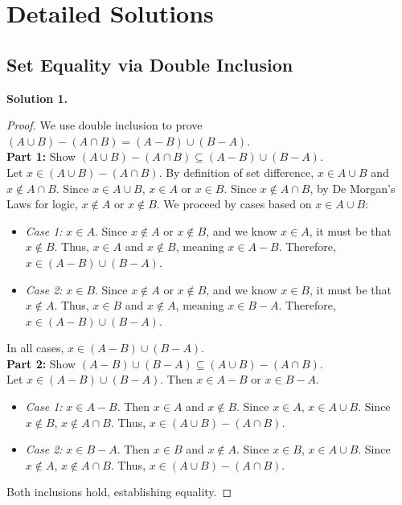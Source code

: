 \documentclass[11pt]{article}
\begin{document}
\newpage

\section{Detailed Solutions}
\label{sec:solutions}

\subsection{Set Equality via Double Inclusion}

\noindent \textbf{Solution 1.}
\begin{proof}
We use double inclusion to prove $(A \cup B) - (A \cap B) = (A - B) \cup (B - A)$. \\
\textbf{Part 1:} Show $(A \cup B) - (A \cap B) \subseteq (A - B) \cup (B - A)$. \\
Let $x \in (A \cup B) - (A \cap B)$. By definition of set difference, $x \in A \cup B$ and $x \notin A \cap B$. Since $x \in A \cup B$, $x \in A$ or $x \in B$. Since $x \notin A \cap B$, by De Morgan's Laws for logic, $x \notin A$ or $x \notin B$. We proceed by cases based on $x \in A \cup B$:
\begin{itemize}
    \item \textit{Case 1:} $x \in A$. Since $x \notin A$ or $x \notin B$, and we know $x \in A$, it must be that $x \notin B$. Thus, $x \in A$ and $x \notin B$, meaning $x \in A - B$. Therefore, $x \in (A - B) \cup (B - A)$.
    \item \textit{Case 2:} $x \in B$. Since $x \notin A$ or $x \notin B$, and we know $x \in B$, it must be that $x \notin A$. Thus, $x \in B$ and $x \notin A$, meaning $x \in B - A$. Therefore, $x \in (A - B) \cup (B - A)$.
\end{itemize}
In all cases, $x \in (A - B) \cup (B - A)$. \\
\textbf{Part 2:} Show $(A - B) \cup (B - A) \subseteq (A \cup B) - (A \cap B)$. \\
Let $x \in (A - B) \cup (B - A)$. Then $x \in A - B$ or $x \in B - A$.
\begin{itemize}
    \item \textit{Case 1:} $x \in A - B$. Then $x \in A$ and $x \notin B$. Since $x \in A$, $x \in A \cup B$. Since $x \notin B$, $x \notin A \cap B$. Thus, $x \in (A \cup B) - (A \cap B)$.
    \item \textit{Case 2:} $x \in B - A$. Then $x \in B$ and $x \notin A$. Since $x \in B$, $x \in A \cup B$. Since $x \notin A$, $x \notin A \cap B$. Thus, $x \in (A \cup B) - (A \cap B)$.
\end{itemize}
Both inclusions hold, establishing equality.
\end{proof}
\end{document}
